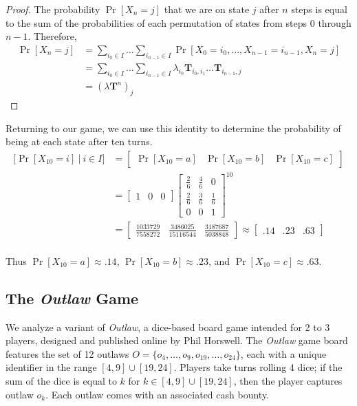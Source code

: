 \documentclass{article}
\newcommand{\T}{\textbf{{T}}}
\theoremstyle{definition}
\theoremstyle{plain}
\begin{document}
	\begin{proof}
	The probability $\Pr[X_n = j]$ that we are on state $j$ after $n$ steps is equal to the sum of the probabilities of each permutation of states from steps $0$ through $n-1$. Therefore,
	\begin{align*}
	\Pr[X_n = j] &= \sum_{i_0 \in I} \dots \sum_{i_{n-1} \in I} \Pr[X_0 = i_0, \dots, X_{n-1} = i_{n-1}, X_n = j]\\
	&= \sum_{i_0 \in I} \dots \sum_{i_{n-1} \in I} \lambda_{i_0}\T_{i_0, i_1}\dots\T_{i_{n-1}, j} \tag{by Theorem 1}\\
	&= (\lambda \T^n)_j
	\end{align*}
	\end{proof}
	
		Returning to our game, we can use this identity to determine the probability of being at each state after ten turns.
		\begin{align*}
		\Big[\Pr[X_{10} = i] ~|~ i \in I\Big] &= 
		\begin{bmatrix}
		\Pr[X_{10} = a] & \Pr[X_{10} = b] & \Pr[X_{10} = c]
		\end{bmatrix}\\ &=
		\begin{bmatrix}
		1 & 0 & 0
		\end{bmatrix}
		\begin{bmatrix}
			\frac{2}{6} & \frac{4}{6} & 0           \\
			\frac{2}{6} & \frac{3}{6} & \frac{1}{6} \\
			0           & 0			  & 1
		\end{bmatrix}
		^{10}\\
		&=	
		\begin{bmatrix}
		\frac{1033729}{7558272} & \frac{3486025}{15116544} & \frac{3187687}{5038848}
		\end{bmatrix}
		\approx \begin{bmatrix}
		.14 & .23 & .63
		\end{bmatrix}
		\end{align*}
	\\
	Thus $\Pr[X_{10} = a] \approx .14$, $\Pr[X_{10} = b] \approx .23$, and $\Pr[X_{10} = c] \approx .63$.
	
	\subsection{The \textit{Outlaw} Game}
	We analyze a variant of \textit{Outlaw}, a dice-based board game intended for 2 to 3 players, designed and published online by Phil Horswell. The \textit{Outlaw} game board features the set of 12 outlaws $O = \{o_4, \dots, o_{9}, o_{19}, \dots, o_{24}\}$, each with a unique identifier in the range $[4, 9] \cup [19, 24]$. Players take turns rolling 4 dice; if the sum of the dice is equal to $k$ for $k \in [4, 9] \cup [19, 24]$, then the player captures outlaw $o_k$. Each outlaw comes with an associated cash bounty.
	
\end{document}
